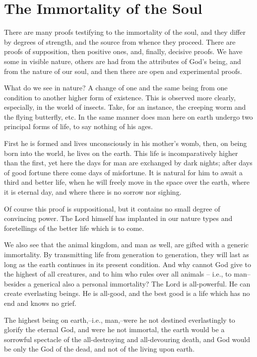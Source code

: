 \chapter{The Immortality of the Soul}

There are many proofs testifying to the immortality of the soul, and they differ by degrees of strength, and the source from whence they proceed. There are proofs of supposition, then  positive ones, and, finally, decisive proofs. We have some in visible nature, others are had from the attributes of God's being, and from the nature of our soul, and then there are open and experimental proofs.

What do we see in nature? A change of one and the same being from one condition to another higher form of existence. This is observed more clearly, especially, in the world of insects. Take, for an instance, the creeping worm and the flying butterfly, etc. In the same manner does man here on earth undergo two principal forms of life, to say nothing of his ages.

First he is formed and lives unconsciously in his mother's womb, then, on being born into the world, he lives on the earth. This life is incomparatively higher than the first, yet here the days for man are exchanged by dark nights; after days of good fortune there come days of misfortune. It is natural for him to await a third and better life, when he will freely move in the space over the earth, where it is eternal day, and where there is no sorrow nor sighing.

Of course this proof is suppositional, but it contains no small degree of convincing power. The Lord himself has implanted in our nature types and foretellings of the better life which is to come.

We also see that the animal kingdom, and man as well, are gifted with a generic immortality. By transmitting life from generation to generation, they will last as long as the earth continues in its present condition. And why cannot God give to the highest of all creatures, and to him who rules over all animals -- i.e., to man-- besides a generical also a personal immortality? The Lord is all-powerful. He can create everlasting beings. He is all-good, and the best good is a life which has no end and knows no grief.

The highest being on earth,--i.e., man,--were he not destined everlastingly to glorify the eternal God, and were he not immortal, the earth would be a sorrowful spectacle of the all-destroying and all-devouring death, and God would be only the God of the dead, and not of the living upon earth.

